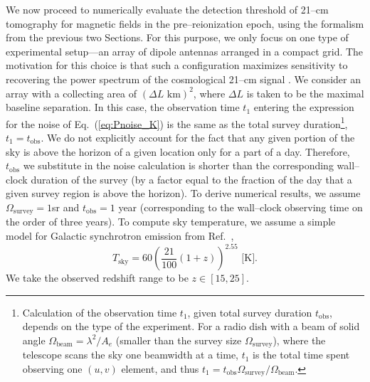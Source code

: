 \documentclass[aps,prd,twocolumn,floatfix,showpacs,superscriptaddress,nofootinbib]{revtex4-1}
\newcommand{\beq}{\begin{equation}}
\newcommand{\eeq}{\end{equation}}
\begin{document}
We now proceed to numerically evaluate the detection threshold of 21--cm tomography for magnetic fields in the pre--reionization epoch, using the formalism from the previous two Sections. For this purpose, we only focus on one type of experimental setup---an array of dipole antennas arranged in a compact grid. The motivation for this choice is that such a configuration maximizes sensitivity to recovering the power spectrum of the cosmological 21--cm signal \cite{2009PhRvD..79h3530T,2015AAS...22532803D}. We consider an array with a collecting area of $(\Delta L\text{ km})^2$, where $\Delta L$ is taken to be the maximal baseline separation. In this case, the observation time $t_1$ entering the expression for the noise of Eq.~(\ref{eq:Pnoise_K}) is the same as the total survey duration\footnote{Calculation of the observation time $t_1$, given total survey duration $t_\text{obs}$, depends on the type of the experiment. For a radio dish with a beam of solid angle $\Omega_\text{beam}=\lambda^2/A_e$ (smaller than the survey size $\Omega_\text{survey}$), where the telescope scans the sky one beamwidth at a time, $t_1$ is the total time spent observing one $(u,v)$ element, and thus $t_1=t_\text{obs}\Omega_\text{survey}/\Omega_\text{beam}$.}, $t_1=t_\text{obs}$. We do not explicitly account for the fact that any given portion of the sky is above the horizon of a given location only for a part of a day. Therefore, $t_\text{obs}$ we substitute in the noise calculation is shorter than the corresponding wall--clock duration of the survey (by a factor equal to the fraction of the day that a given survey region is above the horizon). To derive numerical results, we assume $\Omega_\text{survey}=1$sr and $t_\text{obs}=1$ year (corresponding to the wall--clock observing time on the order of three years). To compute sky temperature, we assume a simple model for Galactic synchrotron emission from Ref.~\cite{2008PhRvD..78b3529M}, 
\beq
T_\text{sky}  = 60\left(\frac{21}{100} (1+z)\right)^{2.55}\text{   [K]}.
\label{eq:tsys}
\eeq
We take the observed redshift range to be $z\in[15,25]$. 
\end{document}
